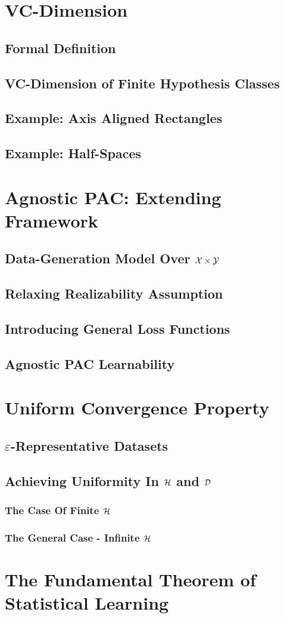     \section{VC-Dimension}
        \subsection{Formal Definition}
        \subsection{VC-Dimension of Finite Hypothesis Classes}
        \subsection{Example: Axis Aligned Rectangles}
        \subsection{Example: Half-Spaces}

    \section{Agnostic PAC: Extending Framework}
        \subsection{Data-Generation Model Over $\mathcal{X}\times\mathcal{Y}$}
        \subsection{Relaxing Realizability Assumption}
        \subsection{Introducing General Loss Functions}
        \subsection{Agnostic PAC Learnability}

    \section{Uniform Convergence Property}
        \subsection{$\varepsilon$-Representative Datasets}
        \subsection{Achieving Uniformity In $\mathcal{H}$ and $\mathcal{D}$}
            \subsubsection{The Case Of Finite $\mathcal{H}$}
            \subsubsection{The General Case - Infinite $\mathcal{H}$}

    \section{The Fundamental Theorem of Statistical Learning} 